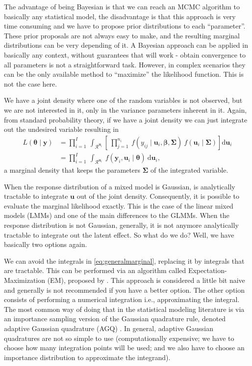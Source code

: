 The advantage of being Bayesian is that we can reach an MCMC algorithm
to basically any statistical model, the disadvantage is that this
approach is very time consuming and we have to propose prior
distributions to each ``parameter''. These prior proposals are not
always easy to make, and the resulting marginal distributions can be
very depending of it. A Bayesian approach can be applied in basically
any context, without guarantees that will work - obtain convergence to
all parameters is not a straightforward task. However, in complex
scenarios they can be the only available method to ``maximize'' the
likelihood function. This is not the case here.

We have a joint density where one of the random variables is not
observed, but we are not interested in it, only in the variance
parameters inherent in it. Again, from standard probability theory, if
we have a joint density we can just integrate out the undesired variable
resulting in
\begin{equation}
 \begin{aligned}
  L(\bm{\theta} \mid \bm{y}) &=
  \prod_{i=1}^{I}~\int_{\mathcal{R}^{\bm{u}_{i}}}
  \left[~\prod_{j=1}^{n_{i}}~
         f(y_{ij} \mid \bm{u}_{i}, \bm{\beta,\Sigma})~
         f(\bm{u}_{i} \mid \bm{\Sigma})
  \right]\text{d} \bm{u}_{i}\\
  &= \prod_{i=1}^{I}~\int_{\mathcal{R}^{\bm{u}_{i}}}~
  f(\bm{y}_{i}, \bm{u}_{i} \mid \bm{\theta})~\text{d} \bm{u}_{i},
  \label{eq:generalmarginal}
 \end{aligned}
\end{equation}
a marginal density that keeps the parameters \(\bm{\Sigma}\) of the
integrated variable.

When the response distribution of a mixed model is Gaussian, is
analytically tractable to integrate \(\bm{u}\) out of the joint density.
Consequently, it is possible to evaluate the marginal likelihood
exactly. This is the case of the linear mixed models (LMMs) and one of
the main differences to the GLMMs. When the response distribution is not
Gaussian, generally, it is not anymore analytically tractable to
integrate out the latent effect. So what do we do? Well, we have
basically two options again.

We can avoid the integrals in \autoref{eq:generalmarginal}, replacing it
by integrals that are tractable. This can be performed via an algorithm
called Expectation-Maximization (EM), proposed by
. This approach is considered a little bit naive and
generally is not recommended if you have a better option. The other
option consists of performing a numerical integration i.e.,
approximating the integral. The most common way of doing that in the
statistical modeling literature is via an importance sampling version of
the Gaussian quadrature rule, denoted adaptive Gaussian quadrature (AGQ)
\cite{quadrature}. In general, adaptive Gaussian quadratures are not so
simple to use (computationally expensive; we have to choose how many
integration points will be used; and we also have to choose an
importance distribution to approximate the integrand).

